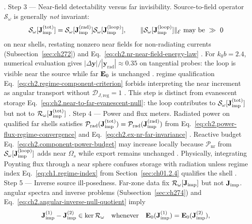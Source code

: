 \cite{stratton1941}. Step 3 — Near-field detectability versus far invisibility. Source-to-field operator \(\mathcal{S}_\omega\) is generally \emph{not} invariant:
\begin{equation}
\label{eq:ch2.ex-nr-near-detectability}
\mathcal{S}_\omega[\mathbf{J}_{\mathrm{imp}}^{(\mathrm{tot})}]
=
\mathcal{S}_\omega[\mathbf{J}_{\mathrm{imp}}^{(\mathrm{rad})}]
\mathcal{S}_\omega[\mathbf{J}_{\mathrm{imp}}^{(\mathrm{loop})}],
\qquad
\|\mathcal{S}_\omega[\mathbf{J}_{\mathrm{imp}}^{(\mathrm{loop})}]\|_{\mathcal{E}}
\ \text{may be}\ \gg\ 0
\end{equation}
on near shells, restating nonzero near fields for non-radiating currents (Subsection~\ref{sec:ch272}) and
Eq.~\eqref{eq:ch2.nr-near-field-energy-law} \cite{stratton1941}. For
\(k_0 b=2.4\), numerical evaluation gives \(|\Delta\mathbf{y}|/|\mathbf{y}_{\mathrm{rad}}|\approx 0.35\)
on tangential probes: the loop is visible near the source while far \(\mathbf{E}_0\) is unchanged
\cite{stratton1941}. regime qualification Eq.~\eqref{eq:ch2.regime-component-criterion} forbids
interpreting the near increment as angular transport without \(\mathcal{D}_{J,\mathrm{reg}}=1\)
\cite{harrington2001}. This step is distinct from evanescent storage
Eq.~\eqref{eq:ch2.near-to-far-evanescent-null}: the loop contributes to
\(\mathcal{S}_\omega[\mathbf{J}_{\mathrm{imp}}^{(\mathrm{tot})}]\) but not to \(\mathcal{R}_\omega[\mathbf{J}_{\mathrm{imp}}^{(\mathrm{tot})}]\)
\cite{stratton1941}.
Step 4 — Power and flux meters. Radiated power on qualified far shells satisfies
\(\mathcal{P}_{\mathrm{rad}}(\mathbf{J}_{\mathrm{imp}}^{(\mathrm{tot})})=\mathcal{P}_{\mathrm{rad}}(\mathbf{J}_{\mathrm{imp}}^{(\mathrm{rad})})\)
from Eq.~\eqref{eq:ch2.power-flux-regime-convergence} and
Eq.~\eqref{eq:ch2.ex-nr-far-invariance} \cite{stratton1941}. Reactive budget
Eq.~\eqref{eq:ch2.component-power-budget} may increase locally because
\(\mathcal{P}_{\mathrm{nr}}\) from \(\mathcal{S}_\omega[\mathbf{J}_{\mathrm{imp}}^{(\mathrm{loop})}]\) adds near
\(\Omega_s\) while export remains unchanged \cite{stratton1941}. Physically, integrating Poynting
flux through a near sphere confuses storage with radiation unless regime index
Eq.~\eqref{eq:ch1.regime-index} from Section~\ref{sec:ch01.2.4} qualifies the shell
\cite{harrington2001}. Step 5 — Inverse source ill-posedness. Far-zone data fix \(\mathcal{R}_\omega[\mathbf{J}_{\mathrm{imp}}]\) but not \(\mathbf{J}_{\mathrm{imp}}\). angular spectra and inverse problems (Subsection~\ref{sec:ch274}) and Eq.~\eqref{eq:ch2.angular-inverse-null-quotient}
imply
\begin{equation}
\label{eq:ch2.ex-nr-inverse-quotient}
\mathbf{J}_{\mathrm{imp}}^{(1)}-\mathbf{J}_{\mathrm{imp}}^{(2)}\in\ker\mathcal{R}_\omega
\quad\text{whenever}\quad
\mathbf{E}_0(\mathbf{J}_{\mathrm{imp}}^{(1)})=\mathbf{E}_0(\mathbf{J}_{\mathrm{imp}}^{(2)}),
\end{equation}
